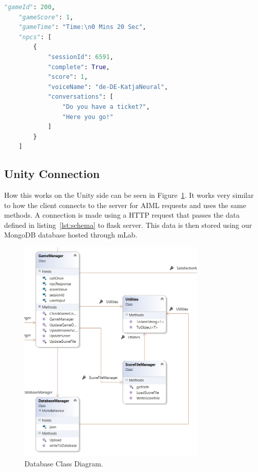 \begin{lstlisting}[caption={MongoDB database schema},label={lst:schema},language=python]
    "gameId": 200,
    "gameScore": 1,
    "gameTime": "Time:\n0 Mins 20 Sec",
    "npcs": [
        {
            "sessionId": 6591,
            "complete": True,
            "score": 1,
            "voiceName": "de-DE-KatjaNeural",
            "conversations": [
                "Do you have a ticket?",
                "Here you go!"
            ]
        }
    ]
\end{lstlisting}

\subsection{Unity Connection}
How this works on the Unity side can be seen in Figure~\ref{image:Database}. It works very similar to how the client connects to the server for AIML requests and uses the same methods. A connection is made using a HTTP request that passes the data defined in listing~\ref{lst:schema} to flask server. This data is then stored using our MongoDB database hosted through mLab.

\begin{figure}[ht]
	\caption{Database Class Diagram.}
	\label{image:Database}
	\centering
	\includegraphics[width=0.8\textwidth]{Images/ClassDiagram Database.png}
\end{figure}

